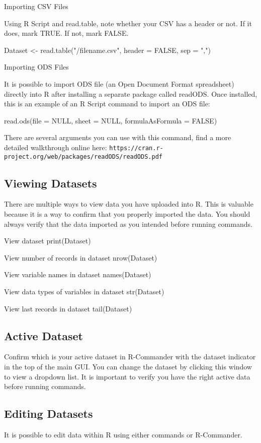 Importing CSV Files

Using R Script and read.table, note whether your CSV has a header or not. If it does, mark TRUE. If not, mark FALSE.

Dataset <-  read.table("/filename.csv", header = FALSE, sep = ",")

Importing ODS Files

It is possible to import ODS file (an Open Document Format spreadsheet) directly into R after installing a separate package called readODS. Once installed, this is an example of an R Script command to import an ODS file:

read.ods(file = NULL, sheet = NULL, formulaAsFormula = FALSE)

There are several arguments you can use with this command, find a more detailed walkthrough online here: \texttt{https://cran.r-project.org/web/packages/readODS/readODS.pdf}

\subsection{Viewing Datasets}
There are multiple ways to view data you have uploaded into R. This is valuable because it is a way to confirm that you properly imported the data. You should always verify that the data imported as you intended before running commands.

View dataset
print(Dataset)

View number of records in dataset
nrow(Dataset)

View variable names in dataset
names(Dataset)

View data types of variables in dataset
str(Dataset)

View last records in dataset
tail(Dataset)

\subsection{Active Dataset}
Confirm which is your active dataset in R-Commander with the dataset indicator in the top of the main GUI. You can change the dataset by clicking this window to view a dropdown list. It is important to verify you have the right active data before running commands.

\subsection{Editing Datasets}
It is possible to edit data within R using either commands or R-Commander.

